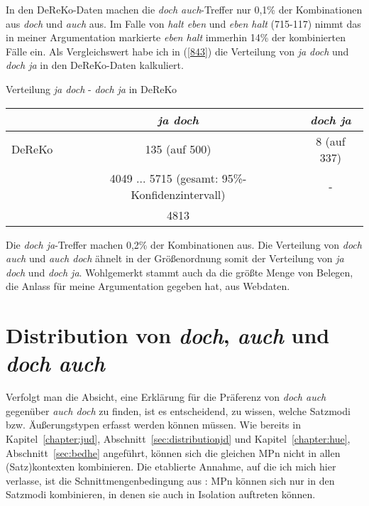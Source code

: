 {In den DeReKo-Daten machen die \textit{doch auch}-Treffer nur 0,1\% der Kombinationen aus \textit{doch} und \textit{auch} aus. Im Falle von \textit{halt eben} und \textit{eben halt} (715-117) nimmt das in meiner Argumentation markierte \textit{eben halt} immerhin 14\% der kombinierten Fälle ein. Als Vergleichswert habe ich in (\ref{843}) die Verteilung von \textit{ja doch} und \textit{doch ja} in den DeReKo-Daten kalkuliert. 
\pagebreak
\begin{exe}
	\ex\label{843} Verteilung \textit{ja doch} - \textit{doch ja} in DeReKo\\[-1em]
	\begin{tabular}[t]{|c|c|c|}
	\hline
	& \textit{ja doch} & \textit{doch ja}\\
	\hline
	DeReKo & 135 (\scriptsize{auf 500}) & 8 (auf 337)\\
	& 4049 ... 5715 \scriptsize{(gesamt: 95\%-Konfidenzintervall}) & -\\
	\hline
	& 4813 & \\
	\hline				 
    \end{tabular}    
\end{exe}	
Die \textit{doch ja}-Treffer machen 0,2\% der Kombinationen aus. Die Verteilung von \textit{doch auch} und \textit{auch doch} ähnelt in der Größenordnung somit der Verteilung von \textit{ja doch} und \textit{doch ja}. Wohlgemerkt stammt auch da die größte Menge von Belegen, die Anlass für meine Argumentation gegeben hat, aus Webdaten. 

\section{Distribution von \textit{doch}, \textit{auch} und \textit{doch auch}}
\label{sec:distributionda}
Verfolgt man die Absicht, eine Erklärung für die Präferenz von \textit{doch auch} gegenüber \textit{auch doch} zu finden, ist es entscheidend, zu wissen, welche Satzmodi  bzw. Äuße\-rungstypen  erfasst werden können müssen. Wie bereits in Kapitel~\ref{chapter:jud}, Abschnitt~\ref{sec:distributionjd} und Kapitel~\ref{chapter:hue}, Abschnitt~\ref{sec:bedhe} angeführt, können sich die gleichen MPn nicht in allen (Satz)kontexten kombinieren. Die etablierte Annahme, auf die ich mich hier verlasse, ist die Schnittmengenbedingung  aus \citet{Thurmair1989, Thurmair1991}: MPn können sich nur in den Satzmodi kombinieren, in denen sie auch in Isolation auftreten können.\\

}
